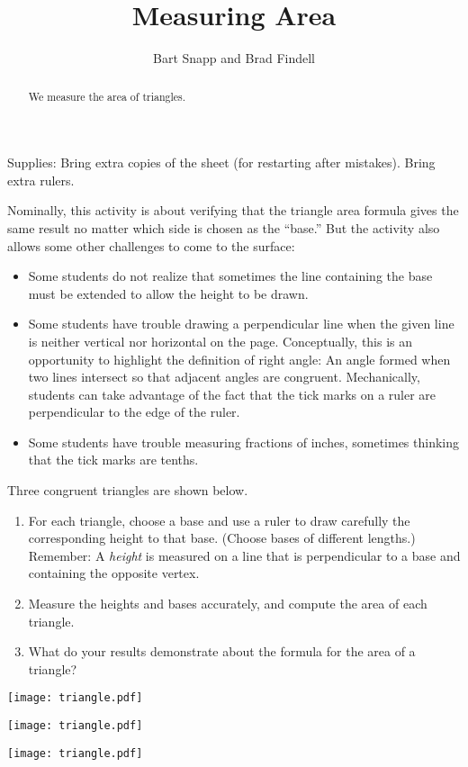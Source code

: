 \documentclass[nooutcomes]{ximera}
\title{Measuring Area}
\author{Bart Snapp and Brad Findell}
\begin{document}
\begin{abstract}
  We measure the area of triangles.
\end{abstract}
\maketitle


\begin{teachingnote}
Supplies: Bring extra copies of the sheet (for restarting after mistakes).  Bring extra rulers. 

Nominally, this activity is about verifying that the triangle area formula gives the same result no matter which
side is chosen as the ``base.''  But the activity also allows some other challenges to come to the surface:  
\begin{itemize}
\item Some students do not realize that sometimes the line containing the base must be 
extended to allow the height to be drawn. 
\item Some students have trouble drawing a perpendicular line when the given line is neither vertical nor 
horizontal on the page.  Conceptually, this is an opportunity to highlight the definition of right angle:  An angle formed when two lines intersect so that adjacent angles are congruent.  Mechanically, students can take advantage of the fact that the tick marks on 
a ruler are perpendicular to the edge of the ruler.  
\item Some students have trouble measuring fractions of inches, sometimes thinking that the tick marks are tenths.  
\end{itemize}
\end{teachingnote}


\begin{problem}
Three congruent triangles are shown below.   
\begin{enumerate}
\item For each triangle, choose a base and use a ruler to draw carefully the corresponding height to that base.  (Choose bases of different lengths.)  Remember:  A \emph{height} is measured on a line that is perpendicular to a base and containing the opposite vertex. 
\item Measure the heights and bases accurately, and compute the area of each triangle.  
\item What do your results demonstrate about the formula for the area of a triangle?  
\end{enumerate}

\begin{image}
\texttt{[image: triangle.pdf]}
\end{image}
\vfill
\newpage

\begin{image}
\texttt{[image: triangle.pdf]}
\end{image}
\begin{image}
\texttt{[image: triangle.pdf]}
\end{image}
\vfill
\end{problem}
\end{document}
